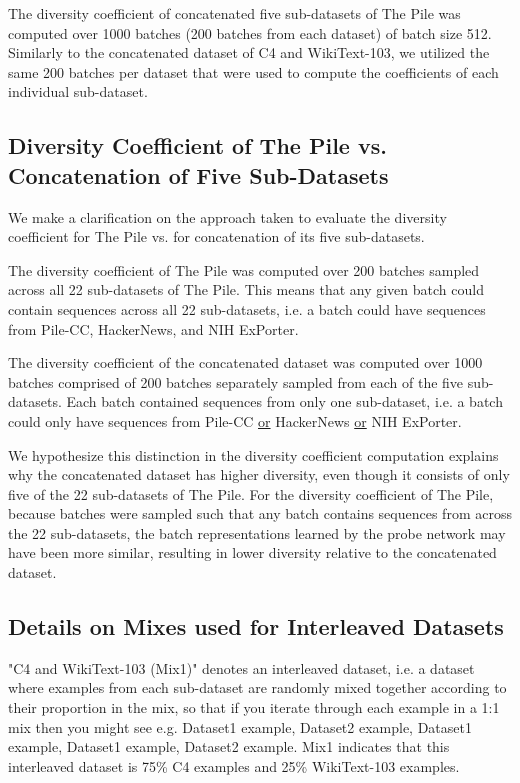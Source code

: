 \documentclass[10pt]{article} %
\begin{document}
The diversity coefficient of concatenated five sub-datasets of The Pile was computed over 1000 batches (200 batches from each dataset) of batch size 512. 
Similarly to the concatenated dataset of C4 and WikiText-103, we utilized the same 200 batches per dataset that were used to compute the coefficients of each individual sub-dataset.


\subsection{Diversity Coefficient of The Pile vs. Concatenation of Five Sub-Datasets}
We make a clarification on the approach taken to evaluate the diversity coefficient for The Pile vs. for concatenation of its five sub-datasets. 

The diversity coefficient of The Pile was computed over 200 batches sampled across all 22 sub-datasets of The Pile.
This means that any given batch could contain sequences across all 22 sub-datasets, i.e. a batch could have sequences from Pile-CC, HackerNews, and NIH ExPorter.

The diversity coefficient of the concatenated dataset was computed over 1000 batches comprised of 200 batches separately sampled from each of the five sub-datasets. 
Each batch contained sequences from only one sub-dataset, i.e. a batch could only have sequences from Pile-CC \underline{or} HackerNews \underline{or} NIH ExPorter.

We hypothesize this distinction in the diversity coefficient computation explains why the concatenated dataset has higher diversity, even though it consists of only five of the 22 sub-datasets of The Pile. 
For the diversity coefficient of The Pile, because batches were sampled such that any batch contains sequences from across the 22 sub-datasets, the batch representations learned by the probe network may have been more similar, resulting in lower diversity relative to the concatenated dataset.

\subsection{Details on Mixes used for Interleaved Datasets}
\label{appendix:mixdetails}

"C4 and WikiText-103 (Mix1)" denotes an interleaved dataset, i.e. a dataset where examples from each sub-dataset are randomly mixed together according to their proportion in the mix, so that if you iterate through each example in a 1:1 mix then you might see e.g. Dataset1 example, Dataset2 example, Dataset1 example, Dataset1 example, Dataset2 example. Mix1 indicates that this interleaved dataset is 75\% C4 examples and 25\% WikiText-103 examples.\\
\end{document}
